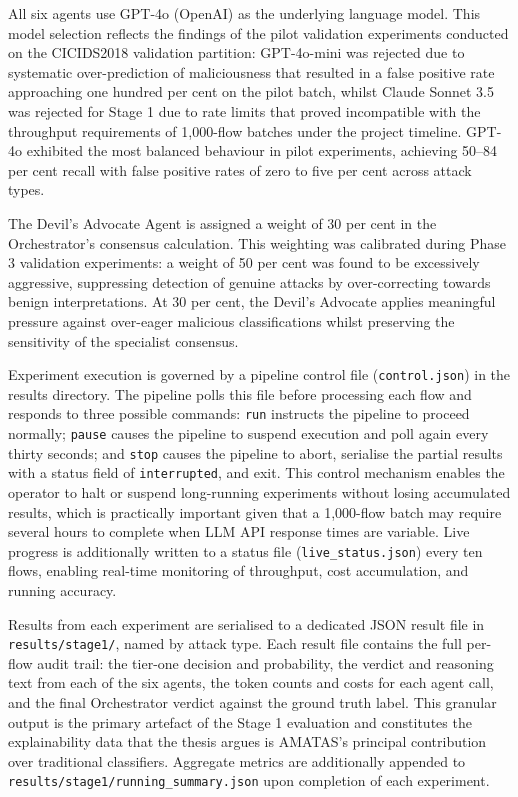 All six agents use GPT-4o (OpenAI) as the underlying language model. This model selection reflects the findings of the pilot validation experiments conducted on the CICIDS2018 validation partition: GPT-4o-mini was rejected due to systematic over-prediction of maliciousness that resulted in a false positive rate approaching one hundred per cent on the pilot batch, whilst Claude Sonnet 3.5 was rejected for Stage 1 due to rate limits that proved incompatible with the throughput requirements of 1,000-flow batches under the project timeline. GPT-4o exhibited the most balanced behaviour in pilot experiments, achieving 50--84 per cent recall with false positive rates of zero to five per cent across attack types.

The Devil's Advocate Agent is assigned a weight of 30 per cent in the Orchestrator's consensus calculation. This weighting was calibrated during Phase 3 validation experiments: a weight of 50 per cent was found to be excessively aggressive, suppressing detection of genuine attacks by over-correcting towards benign interpretations. At 30 per cent, the Devil's Advocate applies meaningful pressure against over-eager malicious classifications whilst preserving the sensitivity of the specialist consensus.

Experiment execution is governed by a pipeline control file (\texttt{control.json}) in the results directory. The pipeline polls this file before processing each flow and responds to three possible commands: \texttt{run} instructs the pipeline to proceed normally; \texttt{pause} causes the pipeline to suspend execution and poll again every thirty seconds; and \texttt{stop} causes the pipeline to abort, serialise the partial results with a status field of \texttt{interrupted}, and exit. This control mechanism enables the operator to halt or suspend long-running experiments without losing accumulated results, which is practically important given that a 1,000-flow batch may require several hours to complete when LLM API response times are variable. Live progress is additionally written to a status file (\texttt{live\_status.json}) every ten flows, enabling real-time monitoring of throughput, cost accumulation, and running accuracy.

Results from each experiment are serialised to a dedicated JSON result file in \texttt{results/stage1/}, named by attack type. Each result file contains the full per-flow audit trail: the tier-one decision and probability, the verdict and reasoning text from each of the six agents, the token counts and costs for each agent call, and the final Orchestrator verdict against the ground truth label. This granular output is the primary artefact of the Stage 1 evaluation and constitutes the explainability data that the thesis argues is AMATAS's principal contribution over traditional classifiers. Aggregate metrics are additionally appended to \texttt{results/stage1/running\_summary.json} upon completion of each experiment.

